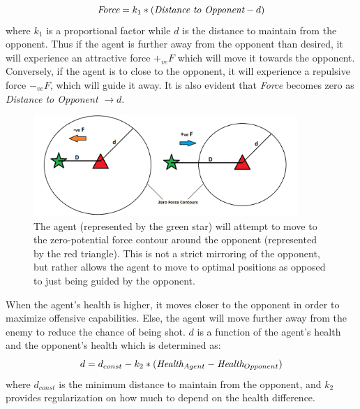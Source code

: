 \documentclass{article}
\theoremstyle{plain}
\theoremstyle{definition}
\theoremstyle{remark}
\begin{document}
$$\emph{Force} = k_1 * (\emph{Distance to Opponent} - d)$$
where $k_1$ is a proportional factor while $d$ is the distance to maintain from the opponent. Thus if the agent is further away from the opponent than desired, it will experience an attractive force $+_{ve}F$ which will move it towards the opponent. Conversely, if the agent is to close to the opponent, it will experience a repulsive force $-_{ve}F$, which will guide it away. It is also evident that \emph{Force} becomes zero as \emph{Distance to Opponent}  $\rightarrow d$.\\ 

\begin{figure}[t]
	\centering
		\includegraphics[width= 10cm]{mirror}
		\caption{The agent (represented by the green star) will attempt to move to the zero-potential force contour around the opponent (represented by the red triangle). This is not a strict mirroring of the opponent, but rather allows the agent to move to optimal positions as opposed to just being guided by the opponent.}		
	\label{mirror}
\end{figure}

When the agent's health is higher, it moves closer to the opponent in order to maximize offensive capabilities. Else, the agent will move further away from the enemy to reduce the chance of being shot. $d$ is a function of the agent's health and the opponent's health which is determined as:
$$d = d_{const} - k_2*(\emph{Health}_{Agent} - \emph{Health}_{Opponent})$$
where $d_{const}$ is the minimum distance to maintain from the opponent, and $k_2$ provides regularization on how much to depend on the health difference.

\end{document}
